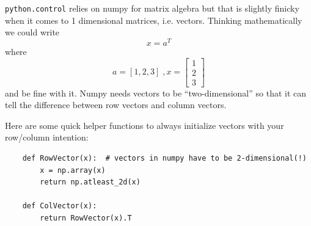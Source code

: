 {\tt python.control} relies on {numpy} for matrix algebra but that is
slightly finicky when it comes to 1 dimensional matrices, i.e. vectors.
Thinking mathematically we could write
\[
x = a^T
\]
where
\[ a = [1, 2, 3] \;, x = \begin{bmatrix} 1\\2\\3 \end{bmatrix}
\]
and be fine with it.   Numpy needs vectors to be ``two-dimensional'' so that it
can tell the difference between row vectors and column vectors.

Here are some quick helper functions to always initialize vectors with your
row/column intention:
\begin{verbatim}
    def RowVector(x):  # vectors in numpy have to be 2-dimensional(!)
        x = np.array(x)
        return np.atleast_2d(x)

    def ColVector(x):
        return RowVector(x).T
\end{verbatim}




